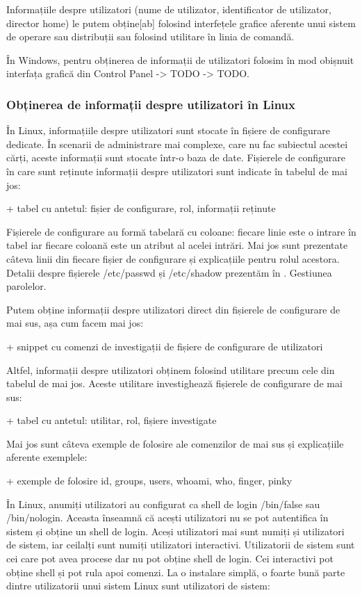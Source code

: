 Informațiile despre utilizatori (nume de utilizator, identificator de
utilizator, director home) le putem obține[ab] folosind interfețele grafice
aferente unui sistem de operare sau distribuții sau folosind utilitare în linia
de comandă.

În Windows, pentru obținerea de informații de utilizatori folosim în mod
obișnuit interfața grafică din Control Panel -> TODO -> TODO.

\subsubsection{Obținerea de informații despre utilizatori în Linux}
\label{sec:users-ops-info-linux}

În Linux, informațiile despre utilizatori sunt stocate în fișiere de configurare
dedicate. În scenarii de administrare mai complexe, care nu fac subiectul
acestei cărți, aceste informații sunt stocate într-o baza de date. Fișierele de
configurare în care sunt reținute informații despre utilizatori sunt indicate în
tabelul de mai jos:

+ tabel cu antetul: fișier de configurare, rol, informații reținute

Fișierele de configurare au formă tabelară cu coloane: fiecare linie este o
intrare în tabel iar fiecare coloană este un atribut al acelei intrări. Mai jos
sunt prezentate câteva linii din fiecare fișier de configurare și explicațiile
pentru rolul acestora. Detalii despre fișierele /etc/passwd și /etc/shadow
prezentăm în . Gestiunea
parolelor.

Putem obține informații despre utilizatori direct din fișierele de configurare
de mai sus, așa cum facem mai jos:

+ snippet cu comenzi de investigații de fișiere de configurare de utilizatori

Altfel, informații despre utilizatori obținem folosind utilitare precum cele din
tabelul de mai jos. Aceste utilitare investighează fișierele de configurare de
mai sus:

+ tabel cu antetul: utilitar, rol, fișiere investigate

Mai jos sunt câteva exemple de folosire ale comenzilor de mai sus și
explicațiile aferente exemplele:

+ exemple de folosire id, groups, users, whoami, who, finger, pinky

În Linux, anumiți utilizatori au configurat ca shell de login /bin/false sau
/bin/nologin. Aceasta înseamnă că acești utilizatori nu se pot autentifica în
sistem și obține un shell de login. Aceși utilizatori mai sunt numiți și
utilizatori de sistem, iar ceilalți sunt numiți utilizatori interactivi.
Utilizatorii de sistem sunt cei care pot avea procese dar nu pot obține shell de
login. Cei interactivi pot obține shell și pot rula apoi comenzi. La o instalare
simplă, o foarte bună parte dintre utilizatorii unui sistem Linux sunt
utilizatori de sistem:

